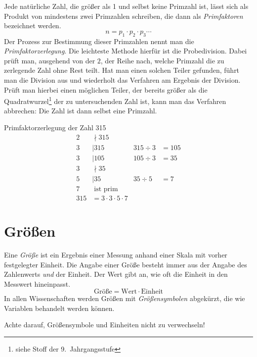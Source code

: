 \begin{defi}[Primfaktoren]
 Jede natürliche Zahl, die größer als 1 und selbst keine Primzahl ist, lässt sich als Produkt von mindestens zwei Primzahlen schreiben, die dann als \emph{Primfaktoren} bezeichnet werden.
 \begin{equation*}
  n = p_1 \cdot p_2 \cdot p_3 \cdots
 \end{equation*}
 Der Prozess zur Bestimmung dieser Primzahlen nennt man die \emph{Primfaktorzerlegung}. Die leichteste Methode hierfür ist die Probedivision. Dabei prüft man, ausgehend von der \(2\), der Reihe nach, welche Primzahl die zu zerlegende Zahl ohne Rest teilt. Hat man einen solchen Teiler gefunden, führt man die Division aus und wiederholt das Verfahren am Ergebnis der Division. Prüft man hierbei einen möglichen Teiler, der bereits größer als die Quadratwurzel\footnote{siehe Stoff der 9.~Jahrgangsstufe} der zu untersuchenden Zahl ist, kann man das Verfahren abbrechen: Die Zahl ist dann selbst eine Primzahl.
\end{defi}

\begin{bsp}
 Primfaktorzerlegung der Zahl 315
 \begin{align*}
  2 &\nmid 315 \\
  3 &\mid 315  & 315 \div 3 &= 105\\
  3 &\mid 105  & 105 \div 3 &= 35\\
  3 &\nmid 35  \\
  5 &\mid 35 &  35 \div 5 &= 7 \\
  7 &\;\text{ist prim}\\ \hline
  315 &= 3\cdot 3 \cdot 5 \cdot 7
 \end{align*}

\end{bsp}

\section{Größen}
\label{sec:groessen}
\begin{defi}[Größe]
 Eine \emph{Größe} ist ein Ergebnis einer Messung anhand einer Skala mit vorher festgelegter Einheit. Die Angabe einer Größe besteht immer aus der Angabe des Zahlenwerts \emph{und} der Einheit. Der Wert gibt an, wie oft die Einheit in den Messwert hineinpasst.
 \begin{equation*}
  \text{Größe} = \text{Wert} \cdot \text{Einheit}
 \end{equation*}
 In allen Wissenschaften werden Größen mit \emph{Größensymbolen} abgekürzt, die wie Variablen behandelt werden können.
 
 Achte darauf, Größensymbole und Einheiten nicht zu verwechseln!
\end{defi}

